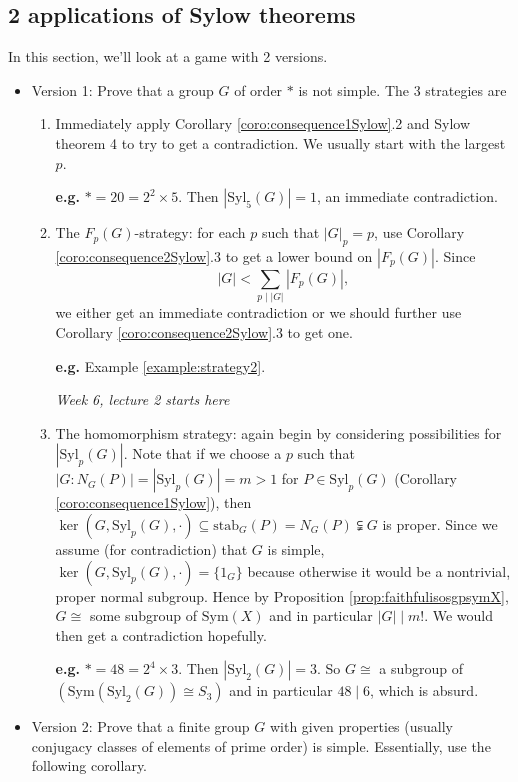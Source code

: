 \documentclass[a4paper]{article}
\newcommand{\Syl}{\text{Syl}}
\newcommand{\stab}{\text{stab}}
\newcommand{\Sym}{\text{Sym}}
\theoremstyle{definition}
\begin{document}
\subsection{2 applications of Sylow theorems}
In this section, we'll look at a game with 2 versions.
\begin{itemize}
\item Version 1: Prove that a group $G$ of order $\ast$ is not simple. The 3 strategies are
\begin{enumerate}
\item Immediately apply Corollary \ref{coro:consequence1Sylow}.2 and Sylow theorem 4 to try to get a contradiction. We usually start with the largest $p$.

\textbf{e.g.} $\ast=20=2^2\times 5$. Then $|\Syl_5(G)|=1$, an immediate contradiction.
\item The $F_p(G)$-strategy: for each $p$ such that $|G|_p=p$, use Corollary \ref{coro:consequence2Sylow}.3 to get a lower bound on $|F_p(G)|$. Since 
\[
|G|<\sum_{p\mid |G|}|F_p(G)|,
\]
we either get an immediate contradiction or we should further use Corollary \ref{coro:consequence2Sylow}.3 to get one.

\textbf{e.g.} Example \ref{example:strategy2}.

\begin{flushright}
\textit{Week 6, lecture 2 starts here}
\end{flushright}

\item The homomorphism strategy: again begin by considering possibilities for $|\Syl_p(G)|$. Note that if we choose a $p$ such that $|G:N_G(P)|=|\Syl_p(G)|=m>1$ for $P\in\Syl_p(G)$ (Corollary \ref{coro:consequence1Sylow}), then $\ker(G,\Syl_p(G),\cdot)\subseteq \stab_G(P)=N_G(P) \subsetneqq G$ is proper. Since we assume (for contradiction) that $G$ is simple, $\ker(G,\Syl_p(G),\cdot)=\{1_G\}$ because otherwise it would be a nontrivial, proper normal subgroup. Hence by Proposition \ref{prop:faithfulisosgpsymX}, $G\cong$ some subgroup of $\Sym(X)$ and in particular $|G|\mid m!$. We would then get a contradiction hopefully.

\textbf{e.g.} $\ast=48=2^4\times 3$. Then $|\Syl_2(G)|=3$. So $G\cong$ a subgroup of $(\Sym(\Syl_2(G))\cong S_3)$ and in particular $48\mid 6$, which is absurd.
\end{enumerate}

\item Version 2: Prove that a finite group $G$ with given properties (usually conjugacy classes of elements of prime order) is simple. Essentially, use the following corollary.
\end{itemize}
\end{document}
